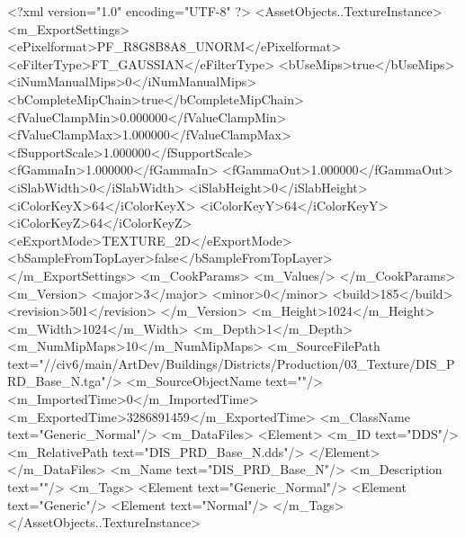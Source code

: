 <?xml version="1.0" encoding="UTF-8" ?>
<AssetObjects..TextureInstance>
	<m_ExportSettings>
		<ePixelformat>PF_R8G8B8A8_UNORM</ePixelformat>
		<eFilterType>FT_GAUSSIAN</eFilterType>
		<bUseMips>true</bUseMips>
		<iNumManualMips>0</iNumManualMips>
		<bCompleteMipChain>true</bCompleteMipChain>
		<fValueClampMin>0.000000</fValueClampMin>
		<fValueClampMax>1.000000</fValueClampMax>
		<fSupportScale>1.000000</fSupportScale>
		<fGammaIn>1.000000</fGammaIn>
		<fGammaOut>1.000000</fGammaOut>
		<iSlabWidth>0</iSlabWidth>
		<iSlabHeight>0</iSlabHeight>
		<iColorKeyX>64</iColorKeyX>
		<iColorKeyY>64</iColorKeyY>
		<iColorKeyZ>64</iColorKeyZ>
		<eExportMode>TEXTURE_2D</eExportMode>
		<bSampleFromTopLayer>false</bSampleFromTopLayer>
	</m_ExportSettings>
	<m_CookParams>
		<m_Values/>
	</m_CookParams>
	<m_Version>
		<major>3</major>
		<minor>0</minor>
		<build>185</build>
		<revision>501</revision>
	</m_Version>
	<m_Height>1024</m_Height>
	<m_Width>1024</m_Width>
	<m_Depth>1</m_Depth>
	<m_NumMipMaps>10</m_NumMipMaps>
	<m_SourceFilePath text="//civ6/main/ArtDev/Buildings/Districts/Production/03_Texture/DIS_PRD_Base_N.tga"/>
	<m_SourceObjectName text=""/>
	<m_ImportedTime>0</m_ImportedTime>
	<m_ExportedTime>3286891459</m_ExportedTime>
	<m_ClassName text="Generic_Normal"/>
	<m_DataFiles>
		<Element>
			<m_ID text="DDS"/>
			<m_RelativePath text="DIS_PRD_Base_N.dds"/>
		</Element>
	</m_DataFiles>
	<m_Name text="DIS_PRD_Base_N"/>
	<m_Description text=""/>
	<m_Tags>
		<Element text="Generic_Normal"/>
		<Element text="Generic"/>
		<Element text="Normal"/>
	</m_Tags>
</AssetObjects..TextureInstance>

